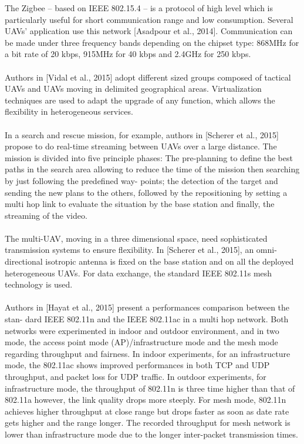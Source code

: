 \documentclass[11pt,openany]{book}
\begin{document}
The Zigbee – based on IEEE 802.15.4 – is a protocol of high level which is particularly useful for short communication range and low consumption. Several UAVs’ application use this network [Asadpour et al., 2014]. Communication can be made under three frequency bands depending on the chipset type: 868MHz for a bit rate of 20 kbps, 915MHz for 40 kbps and 2.4GHz for 250 kbps.\\\\
Authors in [Vidal et al., 2015] adopt diﬀerent sized groups composed of tactical UAVs and UAVs moving in delimited geographical areas. Virtualization techniques are used to adapt the upgrade of any function, which allows the ﬂexibility in heterogeneous services.\\\\
In a search and rescue mission, for example, authors in [Scherer et al., 2015] propose to do real-time streaming between UAVs over a large distance. The mission is divided into ﬁve principle phases: The pre-planning to deﬁne the best paths in the search area allowing to reduce the time of the mission then searching by just following the predeﬁned way- points; the detection of the target and sending the new plans to the others, followed by the repositioning by setting a multi hop link to evaluate the situation by the base station and ﬁnally, the streaming of the video.\\\\
The multi-UAV, moving in a three dimensional space, need sophisticated transmission systems to ensure ﬂexibility. In [Scherer et al., 2015], an omni-directional isotropic antenna is ﬁxed on the base station and on all the deployed heterogeneous UAVs. For data exchange, the standard IEEE 802.11s mesh technology is used.\\\\
Authors in [Hayat et al., 2015] present a performances comparison between the stan- dard IEEE 802.11n and the IEEE 802.11ac in a multi hop network. Both networks were experimented in indoor and outdoor environment, and in two mode, the access point mode (AP)/infrastructure mode and the mesh mode regarding throughput and fairness. In indoor experiments, for an infrastructure mode, the 802.11ac shows improved performances in both TCP and UDP throughput, and packet loss for UDP traﬃc. In outdoor experiments, for infrastructure mode, the throughput of 802.11n is three time higher than that of 802.11a however, the link quality drops more steeply. For mesh mode, 802.11n achieves higher throughput at close range but drops faster as soon as date rate gets higher and the range longer. The recorded throughput for mesh network is lower than infrastructure mode due to the longer inter-packet transmission times.\\\\
\end{document}
